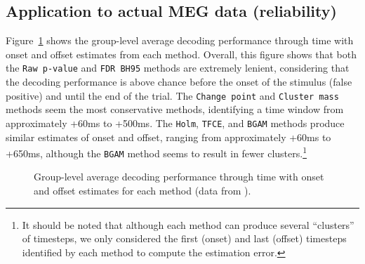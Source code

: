 \documentclass[
  doc,
  floatsintext,
  longtable,
  a4paper,
  nolmodern,
  notxfonts,
  notimes,
  donotrepeattitle,
  colorlinks=true,linkcolor=blue,citecolor=blue,urlcolor=blue]{apa7}
\begin{document}
\newpage

\subsection{Application to actual MEG data
(reliability)}\label{application-to-actual-meg-data-reliability}

Figure~\ref{fig-onset-offset} shows the group-level average decoding
performance through time with onset and offset estimates from each
method. Overall, this figure shows that both the \texttt{Raw\ p-value}
and \texttt{FDR\ BH95} methods are extremely lenient, considering that
the decoding performance is above chance before the onset of the
stimulus (false positive) and until the end of the trial. The
\texttt{Change\ point} and \texttt{Cluster\ mass} methods seem the most
conservative methods, identifying a time window from approximately +60ms
to +500ms. The \texttt{Holm}, \texttt{TFCE}, and \texttt{BGAM} methods
produce similar estimates of onset and offset, ranging from
approximately +60ms to +650ms, although the \texttt{BGAM} method seems
to result in fewer clusters.\footnote{It should be noted that although
  each method can produce several ``clusters'' of timesteps, we only
  considered the first (onset) and last (offset) timesteps identified by
  each method to compute the estimation error.}

\begin{figure}[!htb]

\caption{\label{fig-onset-offset}Group-level average decoding
performance through time with onset and offset estimates for each method
(data from ).}


\end{figure}%
\end{document}
